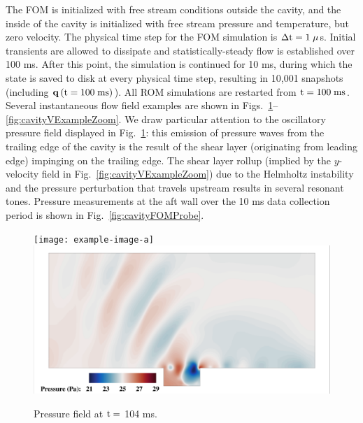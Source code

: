 The FOM is initialized with free stream conditions outside the cavity, and the inside of the cavity is initialized with free stream pressure and temperature, but zero velocity. The physical time step for the FOM simulation is $\Delta \text{t} = 1 \;\mu$s. Initial transients are allowed to dissipate and statistically-steady flow is established over 100 ms. After this point, the simulation is continued for 10 ms, during which the state is saved to disk at every physical time step, resulting in 10,001 snapshots (including $\mathbf{q}\left(\text{t} = 100 \; \text{ms}\right)$). All ROM simulations are restarted from $\text{t} = 100 \; \text{ms}$. Several instantaneous flow field examples are shown in Figs.~\ref{fig:cavityPressExample}--\ref{fig:cavityVExampleZoom}. We draw particular attention to the oscillatory pressure field displayed in Fig.~\ref{fig:cavityPressExample}: this emission of pressure waves from the trailing edge of the cavity is the result of the shear layer (originating from leading edge) impinging on the trailing edge. The shear layer rollup (implied by the $y$-velocity field in Fig.~\ref{fig:cavityVExampleZoom}) due to the Helmholtz instability and the pressure perturbation that travels upstream results in several resonant tones. Pressure measurements at the aft wall over the 10 ms data collection period is shown in Fig.~\ref{fig:cavityFOMProbe}.

\begin{figure}
	\centering
	\ifdefined\DRAFT
		\texttt{[image: example-image-a]}
	\else
		\includegraphics[width=0.9\linewidth,trim={0.5em 0.5em 0.5em 0.5em},clip]{Chapters/CavityAndCVRC/Images/cavity/pressure_example_full.png}
	\fi
	\caption{\label{fig:cavityPressExample}Pressure field at $\text{t} =$ 104 ms.}
\end{figure}


